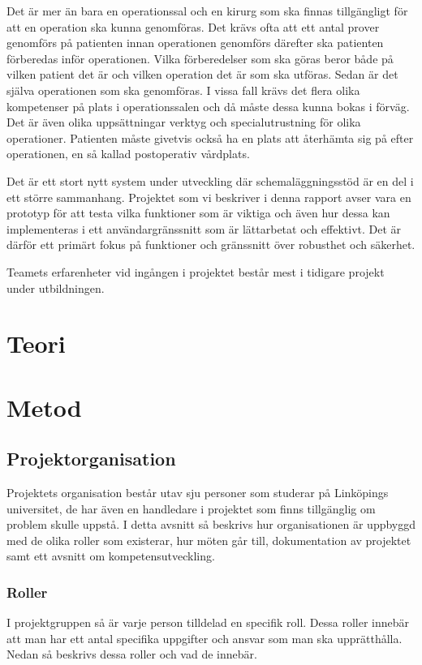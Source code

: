 \documentclass[a4paper,10pt]{article}
\begin{document}
Det är mer än bara en operationssal och en kirurg som ska finnas tillgängligt för att en operation ska kunna genomföras. Det krävs ofta att ett antal prover genomförs på patienten innan operationen genomförs därefter ska patienten förberedas inför operationen. Vilka förberedelser som ska göras beror både på vilken patient det är och vilken operation det är som ska utföras. Sedan är det själva operationen som ska genomföras. I vissa fall krävs det flera olika kompetenser på plats i operationssalen och då måste dessa kunna bokas i förväg. Det är även olika uppsättningar verktyg och specialutrustning för olika operationer.
Patienten måste givetvis också ha en plats att återhämta sig på efter operationen, en så kallad postoperativ vårdplats.

Det är ett stort nytt system under utveckling där schemaläggningsstöd är en del i ett större sammanhang. Projektet som vi beskriver i denna rapport avser vara en prototyp för att testa vilka funktioner som är viktiga och även hur dessa kan implementeras i ett användargränssnitt som är lättarbetat och effektivt. Det är därför ett primärt fokus på funktioner och gränssnitt över robusthet och säkerhet.

Teamets erfarenheter vid ingången i projektet består mest i tidigare projekt under utbildningen.

\section{Teori}

\section{Metod}

\subsection{Projektorganisation}
Projektets organisation består utav sju personer som studerar på Linköpings universitet, de har även en handledare i projektet som finns tillgänglig om problem skulle uppstå. I detta avsnitt så beskrivs hur organisationen är uppbyggd med de olika roller som existerar, hur möten går till, dokumentation av projektet samt ett avsnitt om kompetensutveckling.

\subsubsection{Roller}
I projektgruppen så är varje person tilldelad en specifik roll. Dessa roller innebär att man har ett antal specifika uppgifter och ansvar som man ska upprätthålla. Nedan så beskrivs dessa roller och vad de innebär.
\end{document}
